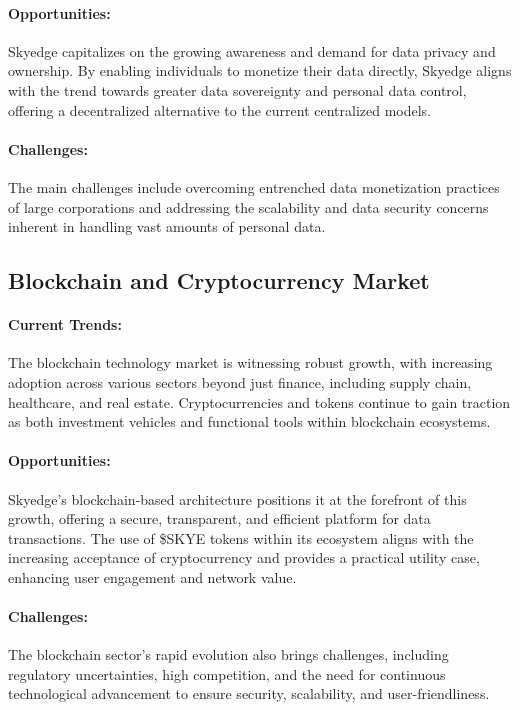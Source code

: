 \documentclass{article}
\begin{document}
\paragraph{Opportunities:} Skyedge capitalizes on the growing awareness and demand for data privacy and ownership. By enabling individuals to monetize their data directly, Skyedge aligns with the trend towards greater data sovereignty and personal data control, offering a decentralized alternative to the current centralized models.

\paragraph{Challenges: }The main challenges include overcoming entrenched data monetization practices of large corporations and addressing the scalability and data security concerns inherent in handling vast amounts of personal data.

\subsection{Blockchain and Cryptocurrency Market}

\paragraph{Current Trends:} The blockchain technology market is witnessing robust growth, with increasing adoption across various sectors beyond just finance, including supply chain, healthcare, and real estate. Cryptocurrencies and tokens continue to gain traction as both investment vehicles and functional tools within blockchain ecosystems.

\paragraph{Opportunities:} Skyedge's blockchain-based architecture positions it at the forefront of this growth, offering a secure, transparent, and efficient platform for data transactions. The use of \$SKYE tokens within its ecosystem aligns with the increasing acceptance of cryptocurrency and provides a practical utility case, enhancing user engagement and network value.

\paragraph{Challenges:} The blockchain sector's rapid evolution also brings challenges, including regulatory uncertainties, high competition, and the need for continuous technological advancement to ensure security, scalability, and user-friendliness.
\end{document}
